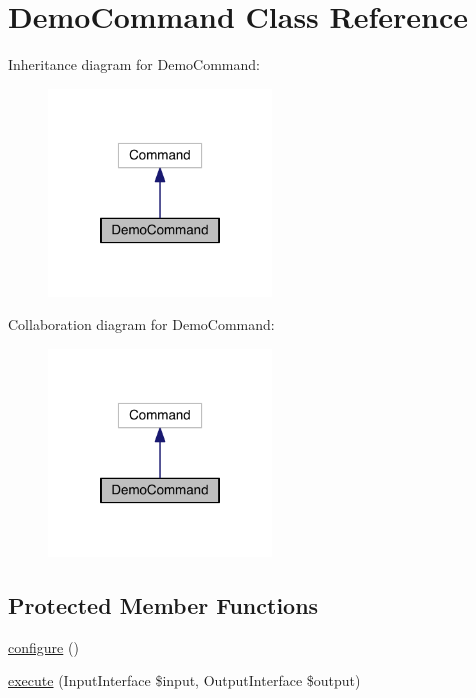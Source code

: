 \hypertarget{classapp_1_1command_1_1_demo_command}{\section{Demo\-Command Class Reference}
\label{classapp_1_1command_1_1_demo_command}
}


Inheritance diagram for Demo\-Command\-:
\nopagebreak
\begin{figure}[H]
\begin{center}
\leavevmode
\includegraphics[width=168pt]{classapp_1_1command_1_1_demo_command__inherit__graph}
\end{center}
\end{figure}


Collaboration diagram for Demo\-Command\-:
\nopagebreak
\begin{figure}[H]
\begin{center}
\leavevmode
\includegraphics[width=168pt]{classapp_1_1command_1_1_demo_command__coll__graph}
\end{center}
\end{figure}
\subsection*{Protected Member Functions}
\begin{DoxyCompactItemize}
\item 
\hyperlink{classapp_1_1command_1_1_demo_command_a9be5e0bdb5720efed6ddb6426c5c16ee}{configure} ()
\item 
\hyperlink{classapp_1_1command_1_1_demo_command_ab31c72b72ddaf7116db5d84c055d3c0b}{execute} (Input\-Interface \$input, Output\-Interface \$output)
\end{DoxyCompactItemize}


